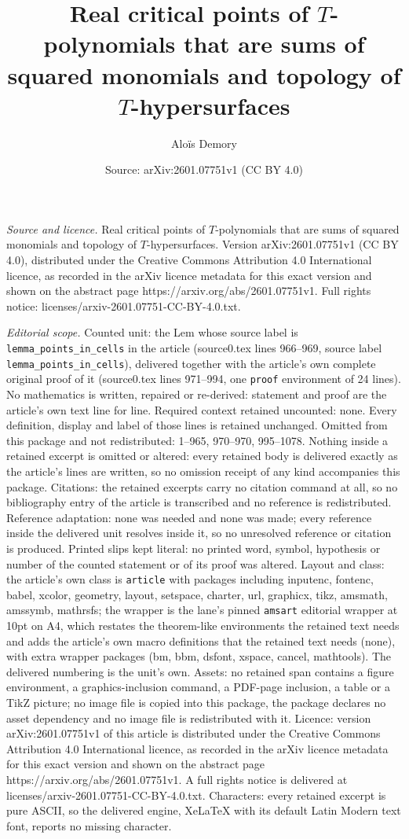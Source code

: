 \documentclass[10pt,a4paper]{amsart}
\title[Real critical points of $T$-polynomials that are sums of squ]{Real critical points of $T$-polynomials that are sums of squared monomials and topology of $T$-hypersurfaces}
\author{Alo\"is Demory}
\date{Source: arXiv:2601.07751v1 (CC BY 4.0)}
\begin{document}
\maketitle

\noindent\emph{Source and licence.} Real critical points of $T$-polynomials that are sums of squared monomials and topology of $T$-hypersurfaces. Version arXiv:2601.07751v1 (CC BY 4.0), distributed under the Creative Commons Attribution 4.0 International licence, as recorded in the arXiv licence metadata for this exact version and shown on the abstract page https://arxiv.org/abs/2601.07751v1. Full rights notice: licenses/arxiv-2601.07751-CC-BY-4.0.txt.\par\smallskip

\noindent\textit{Editorial scope.} Counted unit: the Lem whose source label is \texttt{lemma\_points\_in\_cells} in the article (source0.tex lines 966--969, source label \texttt{lemma\_points\_in\_cells}), delivered together with the article's own complete original proof of it (source0.tex lines 971--994, one \texttt{proof} environment of 24 lines). No mathematics is written, repaired or re-derived: statement and proof are the article's own text line for line. Required context retained uncounted: none. Every definition, display and label of those lines is retained unchanged. Omitted from this package and not redistributed: 1--965, 970--970, 995--1078. Nothing inside a retained excerpt is omitted or altered: every retained body is delivered exactly as the article's lines are written, so no omission receipt of any kind accompanies this package. Citations: the retained excerpts carry no citation command at all, so no bibliography entry of the article is transcribed and no reference is redistributed. Reference adaptation: none was needed and none was made; every reference inside the delivered unit resolves inside it, so no unresolved reference or citation is produced. Printed slips kept literal: no printed word, symbol, hypothesis or number of the counted statement or of its proof was altered. Layout and class: the article's own class is \texttt{article} with packages including inputenc, fontenc, babel, xcolor, geometry, layout, setspace, charter, url, graphicx, tikz, amsmath, amssymb, mathrsfs; the wrapper is the lane's pinned \texttt{amsart} editorial wrapper at 10pt on A4, which restates the theorem-like environments the retained text needs and adds the article's own macro definitions that the retained text needs (none), with extra wrapper packages (bm, bbm, dsfont, xspace, cancel, mathtools). The delivered numbering is the unit's own. Assets: no retained span contains a figure environment, a graphics-inclusion command, a PDF-page inclusion, a table or a TikZ picture; no image file is copied into this package, the package declares no asset dependency and no image file is redistributed with it. Licence: version arXiv:2601.07751v1 of this article is distributed under the Creative Commons Attribution 4.0 International licence, as recorded in the arXiv licence metadata for this exact version and shown on the abstract page https://arxiv.org/abs/2601.07751v1. A full rights notice is delivered at licenses/arxiv-2601.07751-CC-BY-4.0.txt. Characters: every retained excerpt is pure ASCII, so the delivered engine, XeLaTeX with its default Latin Modern text font, reports no missing character.
\end{document}

